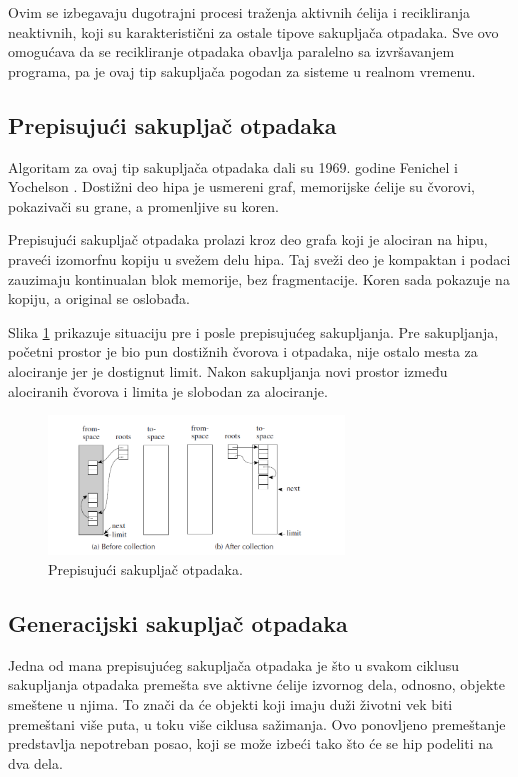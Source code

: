 Ovim se izbegavaju dugotrajni procesi traženja aktivnih ćelija i recikliranja neaktivnih, koji su karakteristični za ostale tipove sakupljača otpadaka. Sve ovo omogućava da se recikliranje otpadaka obavlja paralelno sa izvršavanjem programa, pa je ovaj tip sakupljača pogodan za sisteme u realnom vremenu.

\subsection{Prepisujući sakupljač otpadaka}

Algoritam za ovaj tip sakupljača otpadaka dali su 1969. godine Fenichel i
Yochelson \cite{feni69}. Dostižni deo hipa je usmereni graf, memorijske ćelije su čvorovi, pokazivači su grane, a promenljive su koren.

Prepisujući sakupljač otpadaka prolazi kroz deo grafa koji je alociran na hipu, praveći izomorfnu kopiju u svežem delu hipa. Taj sveži deo je kompaktan i podaci zauzimaju kontinualan blok memorije, bez fragmentacije. Koren sada pokazuje na kopiju, a original se oslobađa. 

Slika \ref{fig:copygc} prikazuje situaciju pre i posle prepisujućeg sakupljanja. Pre sakupljanja, početni prostor je bio pun dostižnih čvorova i otpadaka, nije ostalo mesta za alociranje jer je dostignut limit. Nakon sakupljanja novi prostor između alociranih čvorova i limita je slobodan za alociranje.

\begin{figure}[h]
	\centering
	\includegraphics[width=0.7\textwidth]{copygc.png}
	\caption{Prepisujući sakupljač otpadaka.}
	\label{fig:copygc}
\end{figure}

\subsection{Generacijski sakupljač otpadaka}

Jedna od mana prepisujućeg sakupljača otpadaka je što u svakom ciklusu sakupljanja otpadaka premešta sve aktivne ćelije izvornog dela, odnosno, objekte smeštene u njima. To znači da će objekti koji imaju duži životni vek biti premeštani više puta, u toku više ciklusa sažimanja. Ovo ponovljeno premeštanje predstavlja nepotreban posao, koji se može izbeći tako što će se hip podeliti na dva dela.

